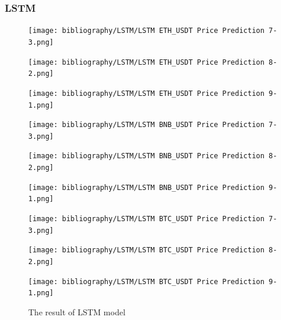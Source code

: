 \documentclass{ieeeojies}
\begin{document}
\subsubsection{LSTM}
\begin{figure}[H]
    \centering
    \begin{minipage}{0.15\textwidth}
    \centering
    \texttt{[image: bibliography/LSTM/LSTM ETH\_USDT Price Prediction 7-3.png]}
    \end{minipage}
    \hfill
    \begin{minipage}{0.15\textwidth}
    \centering
    \texttt{[image: bibliography/LSTM/LSTM ETH\_USDT Price Prediction 8-2.png]}
    \end{minipage}
    \hfill
    \begin{minipage}{0.15\textwidth}
    \centering
    \texttt{[image: bibliography/LSTM/LSTM ETH\_USDT Price Prediction 9-1.png]}
    \end{minipage}
    \centering
    \begin{minipage}{0.15\textwidth}
    \centering
    \texttt{[image: bibliography/LSTM/LSTM BNB\_USDT Price Prediction 7-3.png]}
    \end{minipage}
    \hfill
    \begin{minipage}{0.15\textwidth}
    \centering
    \texttt{[image: bibliography/LSTM/LSTM BNB\_USDT Price Prediction 8-2.png]}
    \end{minipage}
    \hfill
    \begin{minipage}{0.15\textwidth}
    \centering
    \texttt{[image: bibliography/LSTM/LSTM BNB\_USDT Price Prediction 9-1.png]}
    \end{minipage}
    \centering
    \begin{minipage}{0.15\textwidth}
    \centering
    \texttt{[image: bibliography/LSTM/LSTM BTC\_USDT Price Prediction 7-3.png]}
    \end{minipage}
    \hfill
    \begin{minipage}{0.15\textwidth}
    \centering
    \texttt{[image: bibliography/LSTM/LSTM BTC\_USDT Price Prediction 8-2.png]}
    \end{minipage}
    \hfill
    \begin{minipage}{0.15\textwidth}
    \centering
    \texttt{[image: bibliography/LSTM/LSTM BTC\_USDT Price Prediction 9-1.png]}
    \end{minipage}
    \caption{The result of LSTM model}
    \label{fig:enter-label}
\end{figure}
\end{document}
